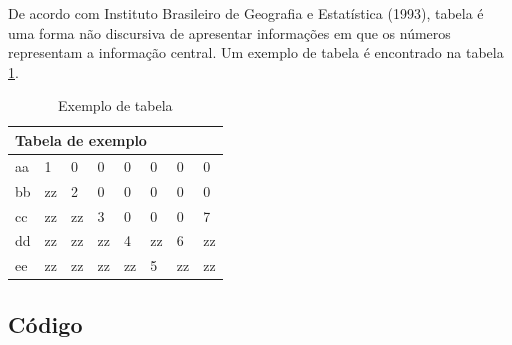 De acordo com Instituto Brasileiro de Geografia e Estatística (1993), tabela é uma forma não discursiva de apresentar informações em que os números representam a informação central. Um exemplo de tabela é encontrado na tabela \ref{tab:tab1}.
\begin{table}[h!]
\centering
\caption{Exemplo de tabela} \label{tab:tab1}
\begin{tabular}{llllllll} 
\hline
\multicolumn{8}{l}{Tabela de exemplo}  \\ 
\hline
aa & 1  & 0  & 0  & 0  & 0  & 0  & 0   \\ 
\hline
bb & zz & 2  & 0  & 0  & 0  & 0  & 0   \\ 
\hline
cc & zz & zz & 3  & 0  & 0  & 0  & 7   \\ 
\hline
dd & zz & zz & zz & 4  & zz & 6  & zz  \\ 
\hline
ee & zz & zz & zz & zz & 5  & zz & zz  \\
\hline
\end{tabular}
\end{table}

\subsection{Código}



